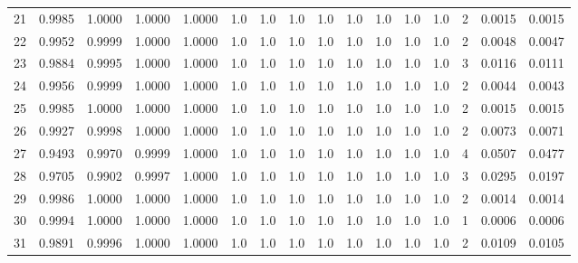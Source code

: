 \begin{tabular}{lrrrrrrrrrrrrrrr}
21  &      0.9985 &  1.0000 &  1.0000 &  1.0000 &     1.0 &     1.0 &     1.0 &     1.0 &     1.0 &     1.0 &      1.0 &        1.0 &      2 &                    0.0015 &                     0.0015 \\
22  &      0.9952 &  0.9999 &  1.0000 &  1.0000 &     1.0 &     1.0 &     1.0 &     1.0 &     1.0 &     1.0 &      1.0 &        1.0 &      2 &                    0.0048 &                     0.0047 \\
23  &      0.9884 &  0.9995 &  1.0000 &  1.0000 &     1.0 &     1.0 &     1.0 &     1.0 &     1.0 &     1.0 &      1.0 &        1.0 &      3 &                    0.0116 &                     0.0111 \\
24  &      0.9956 &  0.9999 &  1.0000 &  1.0000 &     1.0 &     1.0 &     1.0 &     1.0 &     1.0 &     1.0 &      1.0 &        1.0 &      2 &                    0.0044 &                     0.0043 \\
25  &      0.9985 &  1.0000 &  1.0000 &  1.0000 &     1.0 &     1.0 &     1.0 &     1.0 &     1.0 &     1.0 &      1.0 &        1.0 &      2 &                    0.0015 &                     0.0015 \\
26  &      0.9927 &  0.9998 &  1.0000 &  1.0000 &     1.0 &     1.0 &     1.0 &     1.0 &     1.0 &     1.0 &      1.0 &        1.0 &      2 &                    0.0073 &                     0.0071 \\
27  &      0.9493 &  0.9970 &  0.9999 &  1.0000 &     1.0 &     1.0 &     1.0 &     1.0 &     1.0 &     1.0 &      1.0 &        1.0 &      4 &                    0.0507 &                     0.0477 \\
28  &      0.9705 &  0.9902 &  0.9997 &  1.0000 &     1.0 &     1.0 &     1.0 &     1.0 &     1.0 &     1.0 &      1.0 &        1.0 &      3 &                    0.0295 &                     0.0197 \\
29  &      0.9986 &  1.0000 &  1.0000 &  1.0000 &     1.0 &     1.0 &     1.0 &     1.0 &     1.0 &     1.0 &      1.0 &        1.0 &      2 &                    0.0014 &                     0.0014 \\
30  &      0.9994 &  1.0000 &  1.0000 &  1.0000 &     1.0 &     1.0 &     1.0 &     1.0 &     1.0 &     1.0 &      1.0 &        1.0 &      1 &                    0.0006 &                     0.0006 \\
31  &      0.9891 &  0.9996 &  1.0000 &  1.0000 &     1.0 &     1.0 &     1.0 &     1.0 &     1.0 &     1.0 &      1.0 &        1.0 &      2 &                    0.0109 &                     0.0105 \\

\end{tabular}
